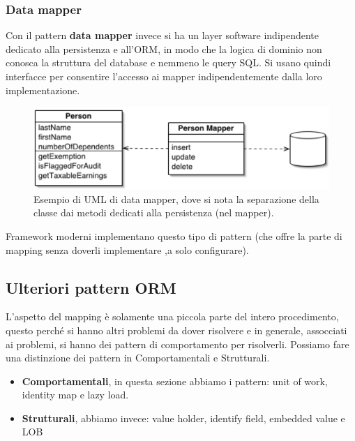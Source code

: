 \subsubsection{Data mapper}
Con il pattern \textbf{data mapper} invece si ha un layer software indipendente dedicato alla persistenza e all'ORM, in modo che la logica di dominio non conosca la struttura del database e nemmeno le query SQL. Si usano quindi interfacce per consentire l'accesso ai mapper indipendentemente dalla loro implementazione.
\begin{figure}[H]
    \centering
    \includegraphics[scale = 0.6]{Imm/databaseMapperSketch.png}
    \caption{Esempio di UML di data mapper, dove si nota la separazione della classe dai metodi dedicati alla persistenza (nel mapper).}
\end{figure}
Framework moderni implementano questo tipo di pattern (che offre la parte di mapping senza doverli implementare ,a solo configurare). 
\subsection{Ulteriori pattern ORM}
L'aspetto del mapping è solamente una piccola parte del intero procedimento, questo perché si hanno altri problemi da dover risolvere e in generale, assocciati ai problemi, si hanno dei pattern di comportamento per risolverli. Possiamo fare una distinzione dei pattern in Comportamentali e Strutturali.
\begin{itemize}
    \item \textbf{Comportamentali}, in questa sezione abbiamo i pattern: unit of work, identity map e lazy load.
    \item \textbf{Strutturali}, abbiamo invece: value holder, identify field, embedded value e LOB
\end{itemize} 

